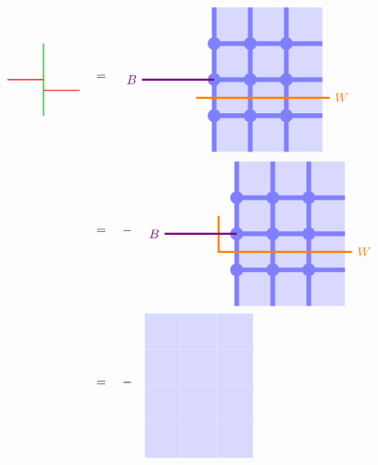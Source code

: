 \documentclass[report,paper=a4, fontsize=12pt, line_length=16cm, number_of_lines=33,dvipdfmx]{jlreq}
\numberwithin{equation}{chapter}
\begin{document}
\begin{align}
    \begin{tikzpicture}[baseline=0]
        \draw[darkgreen,thick] (0,1)--(0,-1);
        \draw[red,thick] (-1,0)--(0,0);
        \draw[red,thick] (1,-0.3)--(0,-0.3);
    \end{tikzpicture}
    \quad
    &=\quad
    \begin{tikzpicture}[baseline=0cm]
        \foreach \x in {0,1,2}{
            \foreach \y in {-2,-1,...,1}{
            \fill[plaqblue](\x,\y) rectangle (\x+1,\y+1);
            }
        }
        \foreach \x in {0,1,2}{
            \foreach \y in {-1,0,1}{
                \fill[linkblue] (\x,\y) circle (1.8mm);
            }
        }
        \foreach \x in {0,1,2}{
            \foreach \y in {-1,0,1}{
                \draw[linkblue, line width = 1.3mm](\x,\y)--(\x + 1,\y);
            }
        }
        \foreach \x in {0,1,2}{
            \foreach \y in {-2,-1,...,1}{
                \draw[linkblue, line width = 1.3mm](\x,\y)--(\x,\y + 1);
            }
        }
        \draw[red!50!yellow, ultra thick](-0.5,-0.5)--(3.2,-0.5) node[right]{$W$};
        \draw[red!50!blue, ultra thick](0,0)--(-2,0) node[left]{$B$};
    \end{tikzpicture}
    \notag\\
    &=\quad - \quad
    \begin{tikzpicture}[baseline=0cm]
        \foreach \x in {0,1,2}{
            \foreach \y in {-2,-1,...,1}{
            \fill[plaqblue](\x,\y) rectangle (\x+1,\y+1);
            }
        }
        \foreach \x in {0,1,2}{
            \foreach \y in {-1,0,1}{
                \fill[linkblue] (\x,\y) circle (1.8mm);
            }
        }
        \foreach \x in {0,1,2}{
            \foreach \y in {-1,0,1}{
                \draw[linkblue, line width = 1.3mm](\x,\y)--(\x + 1,\y);
            }
        }
        \foreach \x in {0,1,2}{
            \foreach \y in {-2,-1,...,1}{
                \draw[linkblue, line width = 1.3mm](\x,\y)--(\x,\y + 1);
            }
        }
        \draw[red!50!yellow, ultra thick](-0.5, 0.5)--(-0.5,-0.5)--(3.2,-0.5) node[right]{$W$};
        \draw[red!50!blue, ultra thick](0,0)--(-2,0) node[left]{$B$};
    \end{tikzpicture}
    \notag\\
    &=\quad - \quad
    \begin{tikzpicture}[baseline=0cm]
        \foreach \x in {0,1,2}{
            \foreach \y in {-2,-1,...,1}{
            \fill[plaqblue](\x,\y) rectangle (\x+1,\y+1);
            }
        }

\end{tikzpicture}
\end{align}
\end{document}

